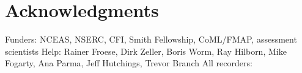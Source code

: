 \documentclass[letterpaper,12pt]{article}
\begin{document}
\section*{Acknowledgments }
Funders: NCEAS, NSERC, CFI, Smith Fellowship, CoML/FMAP, assessment scientists 
Help: Rainer Froese, Dirk Zeller, Boris Worm, Ray Hilborn, Mike Fogarty, Ana Parma, Jeff Hutchings, Trevor Branch
All recorders: 

\newpage
%
%




\appendix



\end{document}
